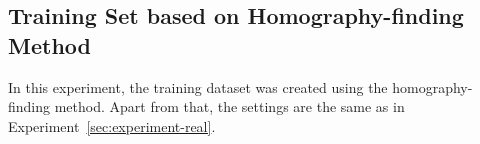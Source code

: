 \documentclass[11pt]{report}
\begin{document}

\subsection{Training Set based on Homography-finding Method}
\label{sec:traininghomo}

In this experiment, the training dataset was created using the
homography-finding method. Apart from that, the settings are the same
as in Experiment~\ref{sec:experiment-real}.
\end{document}
